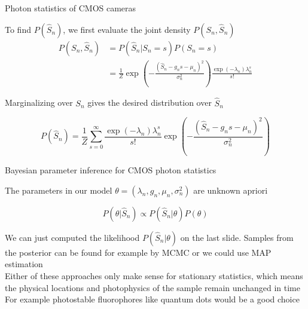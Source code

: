 \documentclass[aspectratio=1610]{beamer}					%
\begin{document}
\begin{frame}{Photon statistics of CMOS cameras}

To find $P(\hat{S}_{n})$, we first evaluate the joint density $P(S_{n},\hat{S}_{n})$
\vspace{0.1in}
\begin{align*}
P(S_{n},\hat{S}_{n}) &= P(\hat{S}_{n}|S_{n}=s)P(S_{n}=s)\\
&= \frac{1}{Z}\exp\left(-\frac{(\hat{S}_{n}-g_{n}s-\mu_{n})^{2}}{\sigma_{n}^{2}}\right)\frac{\exp\left({-\lambda_{n}}\right)\lambda_{n}^{s}}{s!}
\end{align*}
\vspace{0.1in}

Marginalizing over $S_{n}$ gives the desired distribution over $\hat{S}_{n}$

\begin{equation*}
P(\hat{S}_{n}) = \frac{1}{Z}\sum_{s=0}^{\infty}\frac{\exp\left({-\lambda_{n}}\right)\lambda_{n}^{s}}{s!}\exp\left(-\frac{(\hat{S}_{n}-g_{n}s-\mu_{n})^{2}}{\sigma_{n}^{2}}\right)
\end{equation*}

\end{frame}

\begin{frame}{Bayesian parameter inference for CMOS photon statistics}

The parameters in our model $\theta = (\lambda_{n},g_{n},\mu_{n},\sigma^{2}_{n})$ are unknown apriori


\begin{equation*}
P(\theta|\hat{S}_{n}) \propto P(\hat{S}_{n}|\theta)P(\theta)
\end{equation*}

\vspace{0.2in}
We can just computed the likelihood $P(\hat{S}_{n}|\theta)$ on the last slide. Samples from the posterior can be found for example by MCMC or we could use MAP estimation\\
\vspace{0.2in}
Either of these approaches only make sense for stationary statistics, which means the physical locations and photophysics of the sample remain unchanged in time\\
\vspace{0.2in}
For example photostable fluorophores like quantum dots would be a good choice

\end{frame}
\end{document}
